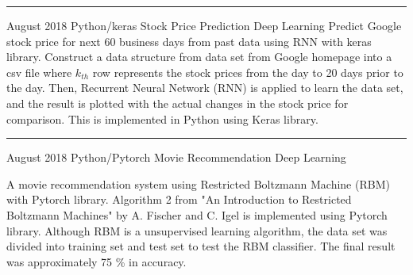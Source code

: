 \documentclass[11pt,a4paper,sans]{moderncv}
\begin{document}
    \noindent\rule{\textwidth}{0.1pt}
        
        \vspace{3pt}





    \cventry    
        {August 2018}
        {Python/keras}
        {Stock Price Prediction}
        {Deep Learning}
        {}
        \hline
        {
            Predict Google stock price for next 60 business days from past data using
        RNN with keras library. Construct a data structure from data set from Google homepage into a csv file 
        where $k_{th}$ row represents the stock prices from the day to 20 days prior 
        to the day. Then, Recurrent Neural Network (RNN) is applied to learn the data set,
        and the result is plotted with the actual changes in the stock price for comparison.
        This is implemented in Python using Keras library.
        }

        \noindent\rule{\textwidth}{0.1pt}

    \vspace{3pt}

    \cventry
        {August 2018}
        {Python/Pytorch}
        {Movie Recommendation}
        {Deep Learning}
        {}
        \hline
        {
            A movie recommendation system using Restricted Boltzmann Machine (RBM) with Pytorch library. 
        Algorithm 2 from "An Introduction to Restricted Boltzmann Machines" by A. Fischer and C. Igel 
        is implemented using Pytorch library. Although RBM is a unsupervised learning algorithm, 
        the data set was divided into training set and test set to test the RBM classifier. 
        The final result was approximately 75 \% in accuracy.
        
        }
\end{document}
